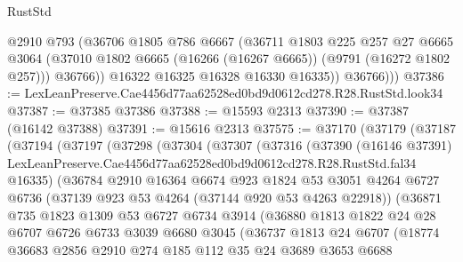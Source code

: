 \begin{lexlean}{RustStd}
\begin{coremodule}
              @2910
              @793
              (@36706
                @1805
                @786
                @6667
                (@36711
                  @1803
                  @225
                  @257
                  @27
                  @6665
                  @3064
                  (@37010 @1802 @6665 (@16266 (@16267 @6665)) (@9791 (@16272 @1802 @257)))
                  @36766))
              @16322
              @16325
              @16328
              @16330
              @16335))
          @36766)))
@37386 := LexLeanPreserve.Cae4456d77aa62528ed0bd9d0612cd278.R28.RustStd.look34
@37387 := @37385 @37386
@37388 := @15593 @2313
@37390 := @37387 (@16142 @37388)
@37391 := @15616 @2313
@37575 := @37170
    (@37179
      (@37187
        (@37194
          (@37197
            (@37298
              (@37304
                (@37307
                  (@37316
                    (@37390
                      (@16146 @37391)
                      LexLeanPreserve.Cae4456d77aa62528ed0bd9d0612cd278.R28.RustStd.fal34
                      @16335)
                    (@36784
                      @2910
                      @16364
                      @6674
                      @923
                      @1824
                      @53
                      @3051
                      @4264
                      @6727
                      @6736
                      (@37139 @923 @53 @4264 (@37144 @920 @53 @4263 @22918))
                      (@36871
                        @735
                        @1823
                        @1309
                        @53
                        @6727
                        @6734
                        @3914
                        (@36880
                          @1813
                          @1822
                          @24
                          @28
                          @6707
                          @6726
                          @6733
                          @3039
                          @6680
                          @3045
                          (@36737
                            @1813
                            @24
                            @6707
                            (@18774
                              @36683
                              @2856
                              @2910
                              @274
                              @185
                              @112
                              @35
                              @24
                              @3689
                              @3653
                              @6688

\end{coremodule}
\end{lexlean}

